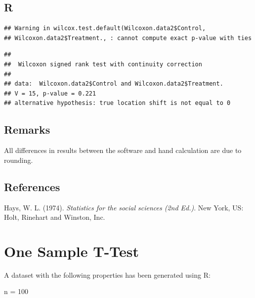 \documentclass[
]{book}
\newenvironment{Shaded}{\begin{snugshade}}{\end{snugshade}}
\newcommand{\DataTypeTok}[1]{\textcolor[rgb]{0.13,0.29,0.53}{#1}}
\newcommand{\KeywordTok}[1]{\textcolor[rgb]{0.13,0.29,0.53}{\textbf{#1}}}
\newcommand{\NormalTok}[1]{#1}
\newcommand{\OperatorTok}[1]{\textcolor[rgb]{0.81,0.36,0.00}{\textbf{#1}}}
\begin{document}
\hypertarget{r-3}{%
\subsection{R}\label{r-3}}

\begin{Shaded}
\end{Shaded}

\begin{verbatim}
## Warning in wilcox.test.default(Wilcoxon.data2$Control,
## Wilcoxon.data2$Treatment., : cannot compute exact p-value with ties
\end{verbatim}

\begin{verbatim}
## 
## 	Wilcoxon signed rank test with continuity correction
## 
## data:  Wilcoxon.data2$Control and Wilcoxon.data2$Treatment.
## V = 15, p-value = 0.221
## alternative hypothesis: true location shift is not equal to 0
\end{verbatim}

\hypertarget{remarks-3}{%
\subsection{Remarks}\label{remarks-3}}

All differences in results between the software and hand calculation are due to rounding.

\hypertarget{references-2}{%
\subsection{References}\label{references-2}}

Hays, W. L. (1974). \emph{Statistics for the social sciences (2nd Ed.)}. New York, US: Holt, Rinehart and Winston, Inc.

\hypertarget{one-sample-t-test}{%
\section{One Sample T-Test}\label{one-sample-t-test}}

A dataset with the following properties has been generated using R:

n = 100
\end{document}
